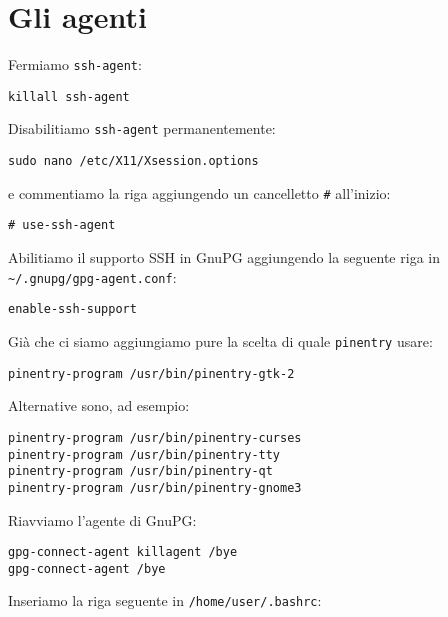 \section{Gli agenti}

Fermiamo \texttt{ssh-agent}:

\begin{lstlisting}
killall ssh-agent
\end{lstlisting}

Disabilitiamo \texttt{ssh-agent} permanentemente:

\begin{lstlisting}
sudo nano /etc/X11/Xsession.options
\end{lstlisting}

e commentiamo la riga aggiungendo un cancelletto \texttt{\#} all'inizio:

\begin{lstlisting}
# use-ssh-agent
\end{lstlisting}

Abilitiamo il supporto SSH in GnuPG aggiungendo la seguente riga in
\texttt{\~{}/.gnupg/gpg-agent.conf}:

\begin{lstlisting}
enable-ssh-support
\end{lstlisting}

Già che ci siamo aggiungiamo pure la scelta di quale \texttt{pinentry} usare:

\begin{lstlisting}
pinentry-program /usr/bin/pinentry-gtk-2
\end{lstlisting}

Alternative sono, ad esempio:

\begin{lstlisting}
pinentry-program /usr/bin/pinentry-curses
pinentry-program /usr/bin/pinentry-tty
pinentry-program /usr/bin/pinentry-qt
pinentry-program /usr/bin/pinentry-gnome3
\end{lstlisting}

Riavviamo l'agente di GnuPG:

\begin{lstlisting}
gpg-connect-agent killagent /bye
gpg-connect-agent /bye
\end{lstlisting}

Inseriamo la riga seguente in \texttt{/home/user/.bashrc}:

